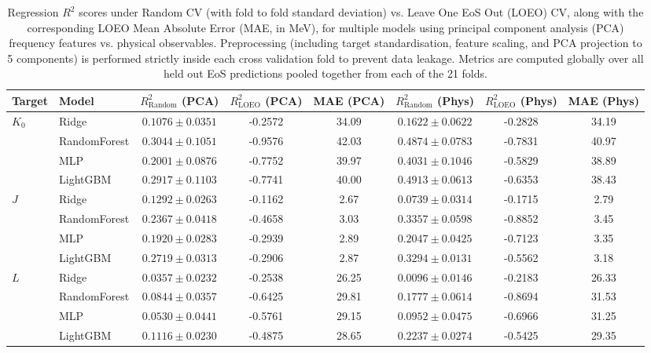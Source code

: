 \documentclass[reprint,aps,prd,floatfix,nofootinbib,superscriptaddress,showpacs]{revtex4-2}
\begin{document}
\begin{table}[t]
\caption{Regression $R^2$ scores under Random CV (with fold to fold standard deviation) vs. Leave One EoS Out (LOEO) CV, along with the corresponding LOEO Mean Absolute Error (MAE, in MeV), for multiple models using principal component analysis (PCA) frequency features vs. physical observables. Preprocessing (including target standardisation, feature scaling, and PCA projection to 5 components) is performed strictly inside each cross validation fold to prevent data leakage. Metrics are computed globally over all held out EoS predictions pooled together from each of the 21 folds.}
\label{tab:phys}
\begin{ruledtabular}
\begin{tabular}{llcccccc}
Target & Model & $R^2_{\text{Random}}$ (PCA) & $R^2_{\text{LOEO}}$ (PCA) & MAE (PCA) & $R^2_{\text{Random}}$ (Phys) & $R^2_{\text{LOEO}}$ (Phys) & MAE (Phys) \\
\midrule
$K_0$    & Ridge        & $0.1076 \pm 0.0351$ & -0.2572 & 34.09 & $0.1622 \pm 0.0622$ & -0.2828 & 34.19 \\
         & RandomForest & $0.3044 \pm 0.1051$ & -0.9576 & 42.03 & $0.4874 \pm 0.0783$ & -0.7831 & 40.97 \\
         & MLP          & $0.2001 \pm 0.0876$ & -0.7752 & 39.97 & $0.4031 \pm 0.1046$ & -0.5829 & 38.89 \\
         & LightGBM     & $0.2917 \pm 0.1103$ & -0.7741 & 40.00 & $0.4913 \pm 0.0613$ & -0.6353 & 38.43 \\
\midrule
$J$      & Ridge        & $0.1292 \pm 0.0263$ & -0.1162 &  2.67 & $0.0739 \pm 0.0314$ & -0.1715 &  2.79 \\
         & RandomForest & $0.2367 \pm 0.0418$ & -0.4658 &  3.03 & $0.3357 \pm 0.0598$ & -0.8852 &  3.45 \\
         & MLP          & $0.1920 \pm 0.0283$ & -0.2939 &  2.89 & $0.2047 \pm 0.0425$ & -0.7123 &  3.35 \\
         & LightGBM     & $0.2719 \pm 0.0313$ & -0.2906 &  2.87 & $0.3294 \pm 0.0131$ & -0.5562 &  3.18 \\
\midrule
$L$      & Ridge        & $0.0357 \pm 0.0232$ & -0.2538 & 26.25 & $0.0096 \pm 0.0146$ & -0.2183 & 26.33 \\
         & RandomForest & $0.0844 \pm 0.0357$ & -0.6425 & 29.81 & $0.1777 \pm 0.0614$ & -0.8694 & 31.53 \\
         & MLP          & $0.0530 \pm 0.0441$ & -0.5761 & 29.15 & $0.0952 \pm 0.0475$ & -0.6966 & 31.25 \\
         & LightGBM     & $0.1116 \pm 0.0230$ & -0.4875 & 28.65 & $0.2237 \pm 0.0274$ & -0.5425 & 29.35 \\
\end{tabular}
\end{ruledtabular}
\end{table}
\end{document}
